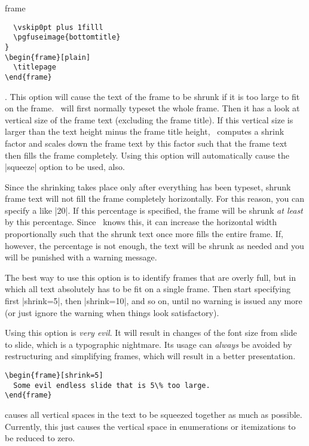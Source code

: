 \begin{environment}{{frame}%
    }
\begin{frame}[<+->][plain]
\begin{frame}
\begin{verbatim}
  \vskip0pt plus 1filll
  \pgfuseimage{bottomtitle}
}
\begin{frame}[plain]
  \titlepage
\end{frame}
\end{verbatim}
  \item
    . This
    option will cause the text of the frame to be shrunk if it is
    too large to fit on the frame. \beamer\ will first normally
    typeset the whole frame. Then it has a look at vertical size of
    the frame text (excluding the frame title). If this vertical size
    is larger than  the text height minus the frame title height,
    \beamer\ computes a shrink factor and scales down the frame text
    by this factor such that the frame text then fills the frame
    completely. Using this option will automatically cause the
    |squeeze| option to be used, also.

    Since the shrinking takes place only after everything has been
    typeset, shrunk frame text will not fill the frame completely
    horizontally. For this reason, you can specify a  like |20|. If this percentage is specified, the
    frame will be shrunk \emph{at least} by this percentage. Since
    \beamer\ knows this, it can increase the horizontal width
    proportionally such that the shrunk text once more fills the
    entire frame. If, however, the percentage is not enough, the text
    will be shrunk as needed and you will be punished with a warning
    message.

    The best way to use this option is to identify frames that are
    overly full, but in which all text absolutely has to be fit on a
    single frame. Then start specifying first |shrink=5|, then
    |shrink=10|, and so on, until no warning is issued any more (or
    just ignore the warning when things look satisfactory).

    Using this option is \emph{very evil}. It will
    result in changes of the font size from slide to slide, which is a
    typographic nightmare. Its usage can \emph{always} be avoided by
    restructuring and simplifying frames, which will result in a
    better presentation.

    \example
\begin{verbatim}
\begin{frame}[shrink=5]
  Some evil endless slide that is 5\% too large.
\end{frame}
\end{verbatim}
  \item
     causes all vertical spaces in the text to be
    squeezed together as much as possible. Currently, this just causes
    the vertical space in enumerations or itemizations to be reduced
    to zero.


\end{frame}
\end{frame}
\end{environment}
